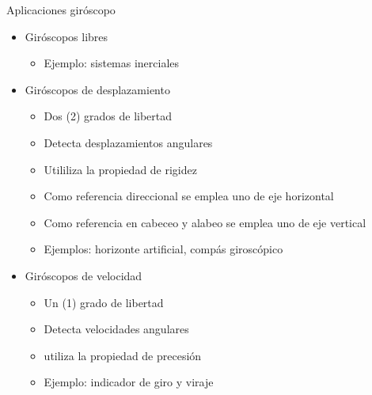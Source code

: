 \begin{frame}{Aplicaciones gir\'oscopo}
  \begin{itemize}
  \item Gir\'oscopos libres
    \begin{itemize}
    \item Ejemplo: sistemas inerciales
    \end{itemize}
  \item Gir\'oscopos de desplazamiento
    \begin{itemize}
    \item Dos (2) grados de libertad
    \item Detecta desplazamientos angulares
    \item Utililiza la propiedad de rigidez
    \item Como referencia direccional se emplea uno de eje horizontal
    \item Como referencia en cabeceo y alabeo se emplea uno de eje vertical
    \item Ejemplos: horizonte artificial, comp\'as girosc\'opico
    \end{itemize}
  \item Gir\'oscopos de velocidad
    \begin{itemize}
    \item Un (1) grado de libertad
    \item Detecta velocidades angulares
    \item utiliza la propiedad de precesi\'on
    \item Ejemplo: indicador de giro y viraje
    \end{itemize}

  \end{itemize}
\end{frame}

